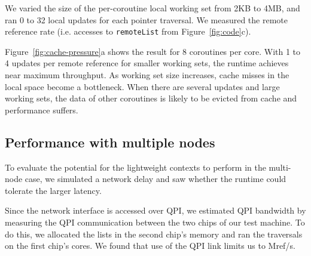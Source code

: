 \documentclass[10pt,nocopyrightspace]{sigplanconf}
\newcommand{\mrps}[1]{\unit[#1]{Mref/s}}
\begin{document}
We varied the size of the per-coroutine local working set from 2KB
to 4MB, and ran 0 to 32 local updates for each pointer
traversal. We measured the remote reference rate (i.e. accesses to \texttt{remoteList} from Figure~\ref{fig:code}c).

Figure~\ref{fig:cache-pressure}a shows the result for 8 coroutines per core. 
With 1 to 4 updates per remote reference for smaller working sets, the runtime achieves near maximum throughput. As working set size increases, cache misses in the local space become a bottleneck. When there are several updates and large working sets, the data of other coroutines is likely to be evicted from cache and performance suffers.


\subsection{Performance with multiple nodes}

To evaluate the potential for the lightweight contexts to perform in the multi-node case, we simulated a network delay and saw whether the runtime could tolerate the larger latency. 

Since the network interface is accessed over QPI, we estimated QPI bandwidth by measuring the QPI communication between the two chips of our test machine. To do this, we allocated the lists in the second chip's memory and ran the traversals on the first chip's cores. We found that use of the QPI link limits us to \mrps{175}.

\end{document}
